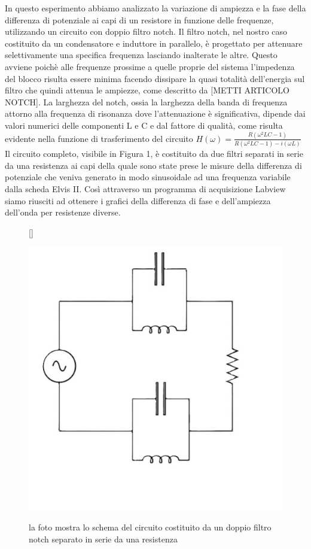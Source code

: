 \documentclass[12pt, letterpaper]{article}
\begin{document}
In questo esperimento abbiamo analizzato la variazione di ampiezza e la fase della differenza di potenziale ai capi di un resistore in funzione delle frequenze, utilizzando un circuito con doppio filtro notch. Il filtro notch, nel nostro caso costituito da un condensatore e induttore in parallelo, è progettato per attenuare selettivamente una specifica frequenza lasciando inalterate le altre. Questo avviene poichè alle frequenze prossime a quelle proprie del sistema l'impedenza del blocco risulta essere minima facendo dissipare la quasi totalità dell’energia sul filtro che quindi attenua le ampiezze, come descritto da [METTI ARTICOLO NOTCH]. La larghezza del notch, ossia la larghezza della banda di frequenza attorno alla frequenza di risonanza dove l'attenuazione è significativa, dipende dai valori numerici delle componenti L e C e dal fattore di qualità, come risulta evidente nella funzione di trasferimento del circuito  $H(\omega) = \frac{R(\omega^2 LC-1)}{R(\omega^2 LC -1) -i(\omega L)}$
Il circuito completo, visibile in Figura 1, è costituito da due filtri separati in serie da una resistenza ai capi della quale sono state prese le misure della differenza di potenziale che veniva generato in modo sinusoidale ad una frequenza variabile dalla scheda Elvis II. Così attraverso un programma di acquisizione Labview siamo riusciti ad ottenere i grafici della differenza di fase e dell’ampiezza dell’onda per resistenze diverse. 
\begin{figure}[h]
[\FBwidth]
{\caption{la foto mostra lo schema del circuito costituito da un doppio filtro notch separato in serie da una resistenza}\label{fig:figura}}
{\includegraphics[width=0.6\linewidth]{circuito.jpeg}}
\end{figure}
\end{document}
